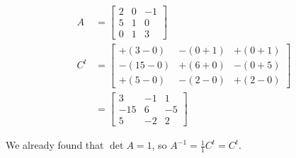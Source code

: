 \begin{itemize}
    \begin{align*}
      A
      &= \begin{bmatrix}
        2 & 0 & -1\\
        5 & 1 &  0 \\
        0 & 1 &  3
      \end{bmatrix}\\
      C^t &= \begin{bmatrix}
        + (3 - 0)  & - (0 + 1) & + (0 + 1)\\
        - (15 - 0) & + (6 + 0) & - (0 + 5) \\
        + (5 - 0)  & - (2 - 0) & + (2 - 0)
      \end{bmatrix}\\
      &= \begin{bmatrix}
        3 & -1 & 1\\
        -15 & 6 &  -5 \\
        5 & -2 &  2
      \end{bmatrix}
    \end{align*}

    We already found that $\det A = 1$, so $A^{-1} = \frac{1}{1} C^t = C^t$.
\end{itemize}
